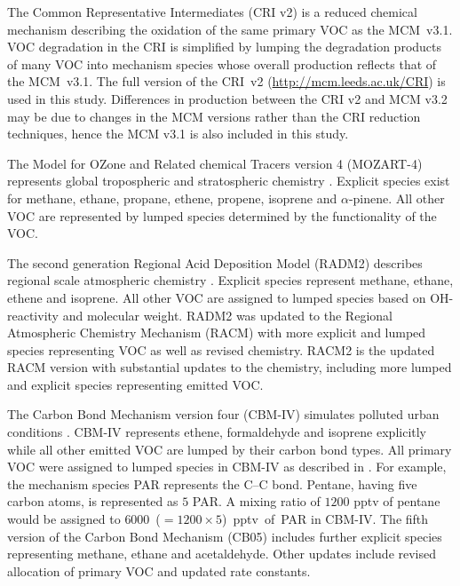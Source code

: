 The Common Representative Intermediates (CRI v2) \citep{Jenkin:2008} is a reduced chemical mechanism describing the oxidation of the same primary VOC as the \mbox{MCM v3.1}. 
VOC degradation in the CRI is simplified by lumping the degradation products of many VOC into mechanism species whose overall  production reflects that of the \mbox{MCM v3.1}. 
The full version of the \mbox{CRI v2} (\url{http://mcm.leeds.ac.uk/CRI}) is used in this study.
Differences in  production between the CRI v2 and MCM v3.2 may be due to changes in the MCM versions rather than the CRI reduction techniques, hence the MCM v3.1 is also included in this study.

The Model for OZone and Related chemical Tracers version 4 (MOZART-4) represents global tropospheric and stratospheric chemistry \citep{Emmons:2010}. 
Explicit species exist for methane, ethane, propane, ethene, propene, isoprene and $\alpha$-pinene.
All other VOC are represented by lumped species determined by the functionality of the VOC.

The second generation Regional Acid Deposition Model (RADM2) describes regional scale atmospheric chemistry \citep{Stockwell:1990}. 
Explicit species represent methane, ethane, ethene and isoprene. 
All other VOC are assigned to lumped species based on OH-reactivity and molecular weight.
RADM2 was updated to the Regional Atmospheric Chemistry Mechanism (RACM) \citep{Stockwell:1997} with more explicit and lumped species representing VOC as well as revised chemistry.
RACM2 is the updated RACM version \citep{Goliff:2013} with substantial updates to the chemistry, including more lumped and explicit species representing emitted VOC.

The Carbon Bond Mechanism version four (CBM-IV) simulates polluted urban conditions \citep{Gery:1989}. 
CBM-IV represents ethene, formaldehyde and isoprene explicitly while all other emitted VOC are lumped by their carbon bond types. 
All primary VOC were assigned to lumped species in CBM-IV as described in \citet{Hogo:1989}. 
For example, the mechanism species PAR represents the C--C bond.
Pentane, having five carbon atoms, is represented as $5$ PAR.
A mixing ratio of $1200$ pptv of pentane would be assigned to \mbox{$6000$ ($= 1200 \times 5$) pptv of PAR} in CBM-IV.
The fifth version of the Carbon Bond Mechanism (CB05) \citep{Yarwood:2005} includes further explicit species representing methane, ethane and acetaldehyde. 
Other updates include revised allocation of primary VOC and updated rate constants.
%
